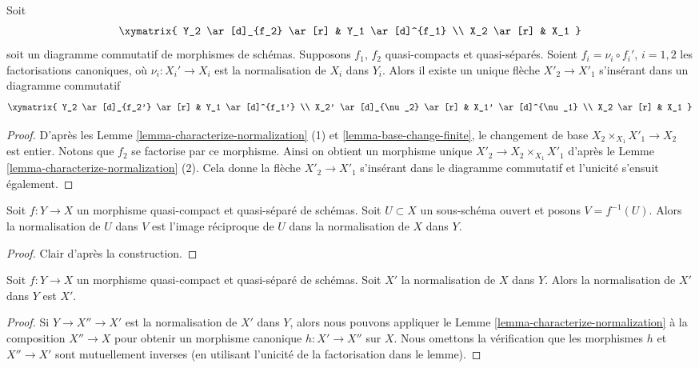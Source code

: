 \begin{lemma}
\label{lemma-functoriality-normalization}
Soit
$$
\xymatrix{
Y_2 \ar[d]_{f_2} \ar[r] & Y_1 \ar[d]^{f_1} \\
X_2 \ar[r] & X_1
}
$$
soit un diagramme commutatif de morphismes de schémas.
Supposons $f_1$, $f_2$ quasi-compacts et
quasi-séparés. Soient $f_i = \nu_i \circ f_i'$, $i = 1, 2$
les factorisations canoniques, où $\nu_i : X_i' \to X_i$ est la normalisation
de $X_i$ dans $Y_i$. Alors il existe un unique flèche
$X'_2 \to X'_1$ s'insérant dans un diagramme
commutatif
$$
\xymatrix{
Y_2 \ar[d]_{f_2'} \ar[r] & Y_1 \ar[d]^{f_1'} \\
X_2' \ar[d]_{\nu_2} \ar[r] & X_1' \ar[d]^{\nu_1} \\
X_2 \ar[r] & X_1
}
$$
\end{lemma}

\begin{proof}
D'après les Lemme \ref{lemma-characterize-normalization} (1) et \ref{lemma-base-change-finite},
le changement de base
$X_2 \times_{X_1} X'_1 \to X_2$ est entier. Notons que $f_2$
se factorise par ce morphisme. Ainsi on
obtient un morphisme unique
$X'_2 \to X_2 \times_{X_1} X'_1$ d'après le Lemme
\ref{lemma-characterize-normalization} (2). Cela donne la flèche
$X'_2 \to X'_1$ s'insérant dans le diagramme
commutatif et l'unicité s'ensuit également.
\end{proof}

\begin{lemma}
\label{lemma-normalization-localization}
Soit $f : Y \to X$ un morphisme quasi-compact et quasi-séparé de schémas. Soit $U \subset X$ un
sous-schéma ouvert et posons $V = f^{-1}(U)$. Alors la normalisation de $U$
dans $V$ est l'image réciproque de $U$ dans la normalisation
de $X$ dans $Y$.
\end{lemma}

\begin{proof}
Clair d'après la construction.
\end{proof}

\begin{lemma}
\label{lemma-normalization-is-normalization}
Soit $f : Y \to X$ un morphisme quasi-compact et quasi-séparé de schémas. Soit $X'$ la normalisation
de $X$ dans $Y$. Alors la normalisation de $X'$ dans $Y$
est $X'$.
\end{lemma}

\begin{proof}
Si $Y \to X'' \to X'$ est la normalisation de $X'$ dans $Y$, alors
nous pouvons appliquer le Lemme \ref{lemma-characterize-normalization} à la composition
$X'' \to X$ pour obtenir un morphisme canonique $h : X' \to X''$ sur
$X$. Nous omettons la vérification que les morphismes $h$
et $X'' \to X'$ sont mutuellement inverses (en utilisant l'unicité
de la factorisation dans le lemme).
\end{proof}

